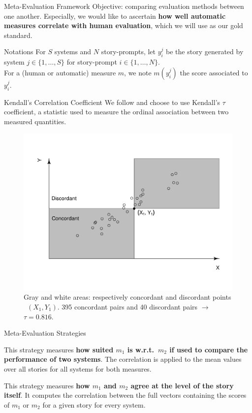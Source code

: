 \begin{frame}{Meta-Evaluation Framework}
    Objective: comparing evaluation methods between one another. Especially, we would like to ascertain \textbf{how well automatic measures correlate with human evaluation}, which we will use as our gold standard.
    \begin{block}{Notations}
        For $S$ systems and $N$ story-prompts, let $y_i^j$ be the story generated by system $j \in \{1,\dots,S\}$ for story-prompt $i \in \{1,\dots,N\}$.\\For a (human or automatic) measure $m$, we note $m(y_i^j)$ the score associated to $y_i^j$.
    \end{block}
\end{frame}

\begin{frame}{Kendall's Correlation Coefficient}
    We follow \citet{gilpin1993table, newson2002parameters} and choose to use Kendall's $\tau$ coefficient, a statistic used to measure the ordinal association between two measured quantities.
    \vspace*{-1em}
    \begin{figure}
        \centering
        \includegraphics[width=0.5\linewidth]{pictures/kendall_correlation.png}
        \caption{Gray and white areas: respectively concordant and discordant points \wrt\ $(X_1,Y_1)$. 395 concordant pairs and 40 discordant pairs $\to$ $\tau = 0.816$.}
        \label{fig:kendall_correlation}
    \end{figure}
\end{frame}

\begin{frame}{Meta-Evaluation Strategies}
    \begin{definition}
        This strategy measures \textbf{how suited $m_1$ is w.r.t.\ $m_2$ if used to compare the performance of two systems}. The correlation is applied to the mean values over all stories for all systems for both measures.
    \end{definition}
    \begin{definition}
        This strategy measures \textbf{how $m_1$ and $m_2$ agree at the level of the story itself}. It computes the correlation between the full vectors containing the scores of $m_1$ or $m_2$ for a given story for every system.
    \end{definition}
\end{frame}

